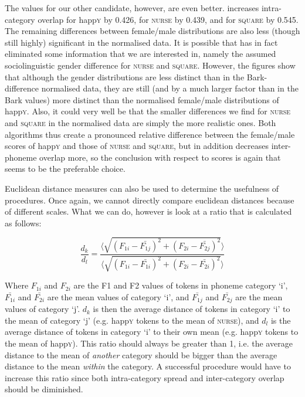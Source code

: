 The values for our other candidate, however, are even better.
\citeauthor{wattfabricius2002} increases intra-category overlap for happ\textsc{y} by 0.426, for \textsc{nurse} by 0.439, and for \textsc{square} by 0.545.
The remaining differences between female/male distributions are also less (though still highly) significant in the \citeauthor{wattfabricius2002} normalised data.
It is possible that \citeauthor{wattfabricius2002} has in fact eliminated some information that we are interested in, namely the assumed sociolinguistic gender difference for \textsc{nurse} and \textsc{square}.
However, the figures show that although the gender distributions are less distinct than in the Bark-difference normalised data, they are still (and by a much larger factor than in the Bark values) more distinct than the normalised female/male distributions of happ\textsc{y}.
Also, it could very well be that the smaller differences we find for \textsc{nurse} and \textsc{square} in the \citeauthor{wattfabricius2002} normalised data are simply the more realistic ones.
Both algorithms thus create a pronounced relative difference between the female/male  scores of happ\textsc{y} and those of \textsc{nurse} and \textsc{square}, but in addition \citeauthor{wattfabricius2002} decreases inter-phoneme overlap more, so the conclusion with respect to  scores is again that \citeauthor{wattfabricius2002} seems to be the preferable choice.

Euclidean distance measures can also be used to determine the usefulness of  procedures. Once again, we cannot directly compare euclidean distances because of different scales. What we can do, however is look at a ratio that is calculated as follows:

\begin{equation}
	\frac{d_{k}}{d_{l}} = \frac{\langle\sqrt{(F_{1i} - \bar{F_{1j}})^2 + (F_{2i} - \bar{F_{2j}})^2}\rangle}
	{\langle\sqrt{(F_{1i} - \bar{F_{1i}})^2 + (F_{2i} - \bar{F_{2i}})^2}\rangle}
\end{equation}

Where \(F_{1i}\) and \(F_{2i}\) are the F1 and F2 values of tokens in phoneme category `i', \(\bar{F_{1i}}\) and \(\bar{F_{2i}}\) are the mean values of category `i', and \(\bar{F_{1j}}\) and \(\bar{F_{2j}}\) are the mean values of category `j'. \(d_{k}\) is then the average distance of tokens in category `i' to the mean of category `j' (e.g. happ\textsc{y} tokens to the mean of \textsc{nurse}), and \(d_{l}\) is the average distance of tokens in category `i' to their own mean (e.g. happ\textsc{y} tokens to the mean of happ\textsc{y}). This ratio should always be greater than 1, i.e. the average distance to the mean of \emph{another} category should be bigger than the average distance to the mean \emph{within} the category. A successful  procedure would have to increase this ratio since both intra-category spread and inter-category overlap should be diminished.

